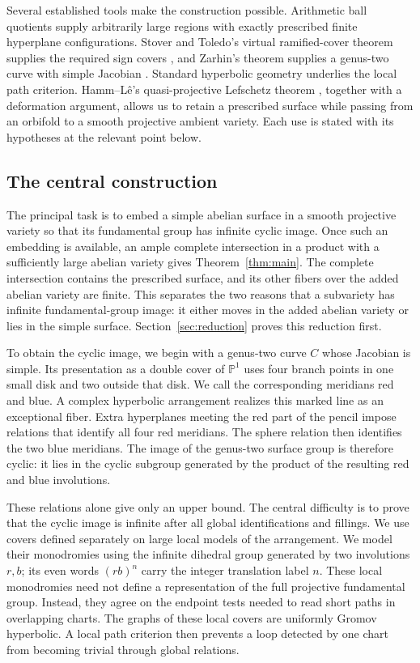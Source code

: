 \documentclass[11pt,reqno]{amsart}
\numberwithin{equation}{section}
\theoremstyle{definition}
\theoremstyle{remark}
\begin{document}
Several established tools make the construction possible.  Arithmetic
ball quotients supply arbitrarily large regions with exactly prescribed
finite hyperplane configurations.  Stover and Toledo's virtual
ramified-cover theorem supplies the required sign covers
\cite{StoverToledo,LlosaPy}, and Zarhin's theorem supplies a
genus-two curve with simple Jacobian \cite{Zarhin}.  Standard
hyperbolic geometry \cite{BridsonHaefliger} underlies the local path
criterion.  Hamm--L\^e's quasi-projective Lefschetz theorem
\cite{HammLe}, together with a deformation argument, allows us to
retain a prescribed surface while passing
from an orbifold to a smooth projective ambient variety.  Each use is
stated with its hypotheses at the relevant point below.

\subsection{The central construction}
The principal task is to embed a simple abelian surface in a smooth
projective variety so that its fundamental group has infinite cyclic
image.  Once such an embedding is available, an ample complete
intersection in a product with a sufficiently large abelian variety
gives Theorem~\ref{thm:main}.  The complete intersection contains the
prescribed surface, and its other fibers over the added abelian variety
are finite.  This separates the two reasons that a subvariety has
infinite fundamental-group image: it either moves in the added abelian
variety or lies in the simple surface.  Section~\ref{sec:reduction}
proves this reduction first.

To obtain the cyclic image, we begin with a genus-two curve $C$ whose
Jacobian is simple.  Its presentation as a double cover of $\mathbb P^1$
uses four branch points in one small disk and two outside that disk.
We call the corresponding meridians red and blue.  A complex hyperbolic
arrangement realizes this marked line as an exceptional fiber.  Extra
hyperplanes meeting the red part of the pencil impose relations that
identify all four red meridians.  The sphere relation then identifies
the two blue meridians.  The image of the genus-two surface group is
therefore cyclic: it lies in the cyclic subgroup generated by the product
of the resulting red and blue involutions.

These relations alone give only an upper bound.  The central difficulty
is to prove that the cyclic image is infinite after all global
identifications and fillings.  We use covers defined separately on
large local models of the arrangement.  We model their monodromies
using the infinite dihedral group generated by two involutions $r,b$;
its even words $(rb)^n$ carry the integer translation label $n$.
These local monodromies need not
define a representation of the full projective fundamental group.
Instead, they agree on the endpoint tests needed to read short paths
in overlapping charts.  The graphs of these local covers are uniformly
Gromov hyperbolic.  A local path criterion then prevents a loop detected
by one chart from becoming trivial through global relations.
\end{document}
